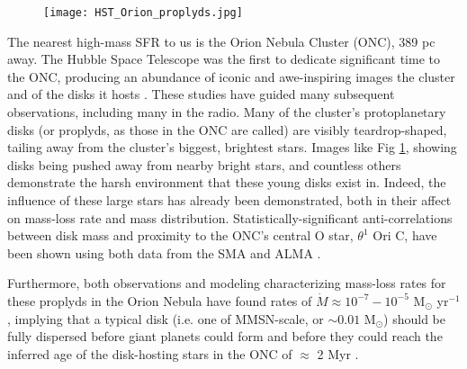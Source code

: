 \begin{figure}[t!]
\centering
  \texttt{[image: HST\_Orion\_proplyds.jpg]}
  \label{fig:HST_ONC}
\end{figure}



The nearest high-mass SFR to us is the Orion Nebula Cluster (ONC), 389 pc away. The Hubble Space Telescope was the first to dedicate significant time to the ONC, producing an abundance of iconic and awe-inspiring images the cluster and of the disks it hosts \citep{Ricci2008}. These studies have guided many subsequent observations, including many in the radio. Many of the cluster's protoplanetary disks (or proplyds, as those in the ONC are called) are visibly teardrop-shaped, tailing away from the cluster's biggest, brightest stars. Images like Fig \ref{fig:HST_ONC}, showing disks being pushed away from nearby bright stars, and countless others demonstrate the harsh environment that these young disks exist in. Indeed, the influence of these large stars has already been demonstrated, both in their affect on mass-loss rate and mass distribution. Statistically-significant anti-correlations between disk mass and proximity to the ONC's central O star, $\theta^1$ Ori C, have been shown using both data from the SMA \citep{MannWilliams2009} and ALMA \citep{Mann2014,Ansdell2017,Eisner2018}.


Furthermore, both observations \citep{HenneyODell1999} and modeling \citep{Haworth2016} characterizing mass-loss rates for these proplyds in the Orion Nebula have found rates of $\dot{M} \approx 10^{-7}-10^{-5}$ M$_{\odot}$ yr$^{-1}$, implying that a typical disk (i.e. one of MMSN-scale, or $\sim0.01$ M$_{\odot}$) should be fully dispersed before giant planets could form \citep{Hubickyj2005} and before they could reach the inferred age of the disk-hosting stars in the ONC of $\approx$ 2 Myr \citep{Reggiani2011}.


